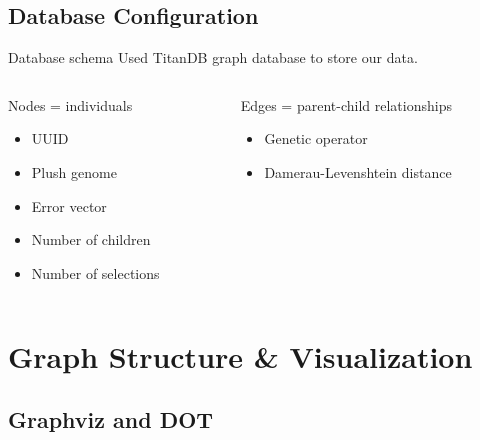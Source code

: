 \documentclass{beamer}
\begin{document}
\subsection{Database Configuration}
\begin{frame}{Database schema}
Used TitanDB graph database to store our data.
\vspace{.5cm}
\begin{columns}[t]
\begin{column}{0.45\textwidth}
Nodes = individuals
	\begin{itemize}
    	\setlength\itemsep{.5em}
		\item UUID
		\item Plush genome
		\item Error vector
		\item Number of children
		\item Number of selections
	\end{itemize}
\end{column}
\begin{column}{0.5\textwidth}
Edges = parent-child relationships
	\begin{itemize}
    	\setlength\itemsep{.5em}
		\item Genetic operator
		\item Damerau-Levenshtein distance
	\end{itemize}
\end{column}
\end{columns}
\end{frame}


\section{Graph Structure \& Visualization}

\subsection{Graphviz and DOT}
\end{document}

